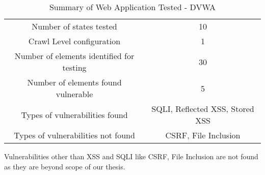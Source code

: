 \begin{table}[h]
\label{Summary of Web Application Tested - DVWA}
\caption{Summary of Web Application Tested - DVWA}
\begin{tabular}[h]{||c | c||}
\hline
Number of states tested                    & 10  \\
Crawl Level configuration                   & 1  \\
Number of elements identified for testing   & 30  \\
Number of elements found vulnerable        & 5 \\
Types of vulnerabilities found             & SQLI, Reflected XSS, Stored XSS  \\
Types of vulnerabilities not found    & CSRF, File Inclusion   \\
\hline

\end{tabular}
\end{table}
Vulnerabilities other than XSS and SQLI like CSRF, File Inclusion are not found as they are beyond scope of our thesis.
